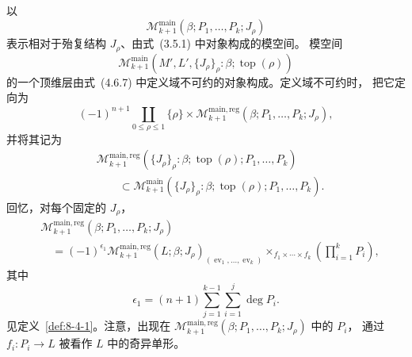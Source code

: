 以
\[
 \mathcal M_{k+1}^{\mathrm{main}}
 (\beta;P_1,\ldots,P_k;J_\rho)
\]
表示相对于殆复结构 $J_\rho$、由式~(3.5.1) 中对象构成的模空间。
模空间
\[
 \mathcal M_{k+1}^{\mathrm{main}}
 (M',L',\{J_\rho\}_\rho:\beta;\operatorname{top}(\rho))
\]
的一个顶维层由式~(4.6.7) 中定义域不可约的对象构成。定义域不可约时，
把它定向为
\begin{equation}
 (-1)^{n+1}
 \coprod_{0\leq\rho\leq1}
 \{\rho\}\times
 \mathcal M_{k+1}^{\mathrm{main},\mathrm{reg}}
 (\beta;P_1,\ldots,P_k;J_\rho),
\tag{8.9.1}\label{eq:8-9-1}
\end{equation}
并将其记为
\[
\begin{aligned}
 &\mathcal M_{k+1}^{\mathrm{main},\mathrm{reg}}
 (\{J_\rho\}_\rho:\beta;\operatorname{top}(\rho);
  P_1,\ldots,P_k)\\
 &\qquad\subset
 \mathcal M_{k+1}^{\mathrm{main}}
 (\{J_\rho\}_\rho:\beta;\operatorname{top}(\rho);
  P_1,\ldots,P_k).
\end{aligned}
\]
回忆，对每个固定的 $J_\rho$，
\[
\begin{aligned}
 &\mathcal M_{k+1}^{\mathrm{main},\mathrm{reg}}
 (\beta;P_1,\ldots,P_k;J_\rho)\\
 &\quad={}
 (-1)^{\epsilon_1}
 \mathcal M_{k+1}^{\mathrm{main},\mathrm{reg}}
 (L;\beta;J_\rho)_{
 (\operatorname{ev}_1,\ldots,\operatorname{ev}_k)}
 \mathop{\times}_{f_1\times\cdots\times f_k}
 \left(\prod_{i=1}^{k}P_i\right),
\end{aligned}
\]
其中
\[
 \epsilon_1=(n+1)
 \sum_{j=1}^{k-1}\sum_{i=1}^{j}\deg P_i.
\]
见定义~\ref{def:8-4-1}。注意，出现在
$\mathcal M_{k+1}^{\mathrm{main},\mathrm{reg}}
(\beta;P_1,\ldots,P_k;J_\rho)$ 中的 $P_i$，
通过 $f_i\colon P_i\to L$ 被看作 $L$ 中的奇异单形。

